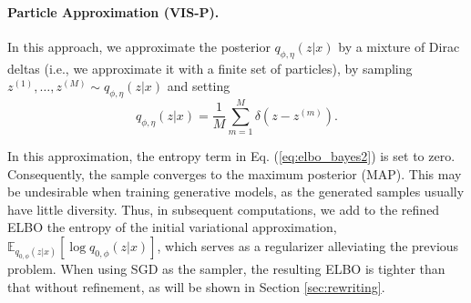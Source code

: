     \paragraph{Particle Approximation (VIS-P).} %
    
    In this approach, we approximate the posterior $q_{\phi,\eta}(z|x)$ by a mixture of Dirac deltas (i.e., we approximate it with a finite set of particles), by sampling $z^{(1)}, \ldots, z^{(M)} \sim q_{\phi,\eta}(z|x)$ and setting 
    $$
    q_{\phi,\eta}(z|x) = \frac{1}{M} \sum_{m=1}^M \delta(z - z^{(m)}).
    $$
    
    { In this approximation, the entropy term in Eq. (\ref{eq:elbo_bayes2}) 
    is set to zero. Consequently,  the sample converges to the 
    maximum posterior (MAP).} This may be undesirable when training generative models, as the generated samples usually have little diversity. Thus, in subsequent computations, we add to the refined ELBO the entropy of the initial variational approximation, $\mathbb{E}_{q_{0,\phi}(z|x)} \left[ \log q_{0,\phi}(z | x) \right]$, which
    serves as a regularizer alleviating the previous problem. When using SGD as the sampler, the resulting ELBO is tighter than that without refinement,
    as will be shown in Section \ref{sec:rewriting}. 
    
    
    

